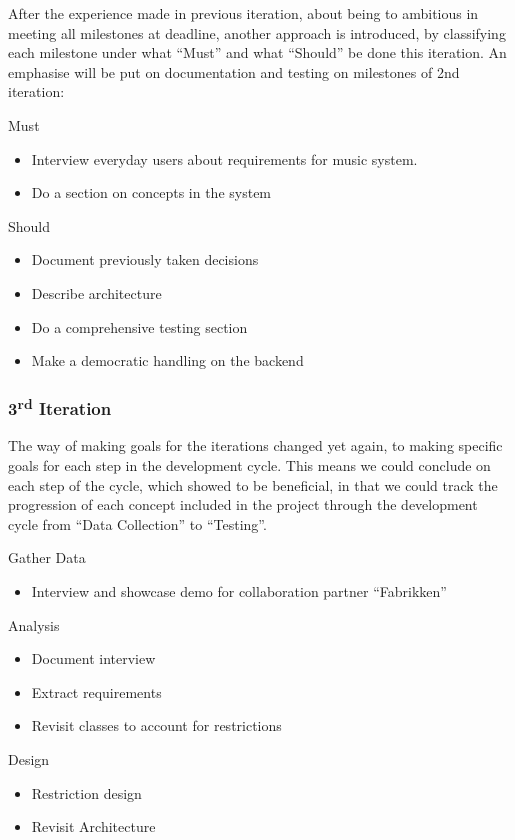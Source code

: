 	After the experience made in previous iteration, about being to ambitious in meeting all milestones at deadline, another approach is introduced, by classifying each milestone under what \enquote{Must} and what \enquote{Should} be done this iteration. An emphasise will be put on documentation and testing on milestones of 2nd iteration:

	Must
	\begin{itemize}
		\item Interview everyday users about requirements for music system.
		\item Do a section on concepts in the system
	\end{itemize}

	Should
	\begin{itemize}
		\item Document previously taken decisions
		\item Describe architecture
		\item Do a comprehensive testing section
		\item Make a democratic handling on the backend
	\end{itemize}

\subsubsection{3\textsuperscript{rd} Iteration}

  The way of making goals for the iterations changed yet again, to making specific goals for each step in the development cycle. This means we could conclude on each step of the cycle, which showed to be beneficial, in that we could track the progression of each concept included in the project through the development cycle from \enquote{Data Collection} to \enquote{Testing}.

  Gather Data
  \begin{itemize}
    \item Interview and showcase demo for collaboration partner \enquote{Fabrikken}
  \end{itemize}

  Analysis
  \begin{itemize}
    \item Document interview
    \item Extract requirements
    \item Revisit classes to account for restrictions
  \end{itemize}

  Design
  \begin{itemize}
    \item Restriction design
    \item Revisit Architecture
  \end{itemize}

